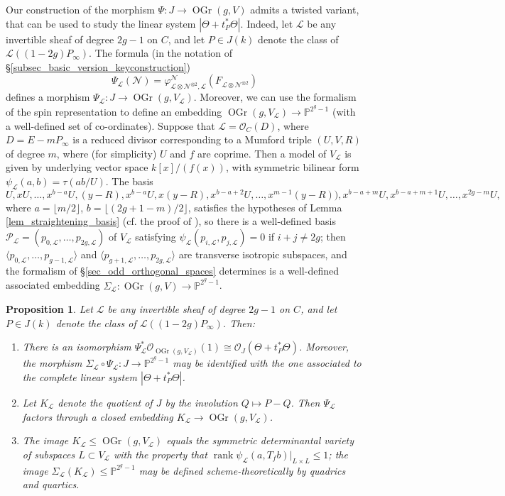 \documentclass{article} %
\newtheorem{proposition}{Proposition}[section]
\numberwithin{equation}{section}
\DeclareMathOperator{\rank}{rank}
\newcommand{\sh}[1]{\mathscr{#1}}
\renewcommand{\P}{\mathbb{P}}
\newcommand{\cO}{\mathcal{O}}
\DeclareMathOperator{\OGr}{OGr}
\begin{document}
Our construction of the morphism $\Psi : J \to \OGr(g, V)$ admits a twisted variant, that can be used to study the linear system $| \Theta + t_P^\ast \Theta|$. Indeed, let $\sh{L}$ be any invertible sheaf of degree $2g-1$ on $C$, and let $P \in J(k)$ denote the class of $\sh{L}((1-2g) P_\infty)$. The formula (in the notation of \S\ref{subsec_basic_version_keyconstruction})
\[ \Psi_{\sh{L}}(\sh{N}) = \varphi^{\sh{N}}_{\sh{L} \otimes \sh{N}^{\otimes 2}, \sh{L}}(F_{\sh{L} \otimes \sh{N}^{\otimes 2}}) \]
defines a morphism $\Psi_{\sh{L}} : J \to \OGr(g, V_{\sh{L}})$. Moreover, we can use the formalism of the spin representation to define an embedding $\OGr(g, V_{\sh{L}}) \to \P^{2^g-1}$ (with a well-defined set of co-ordinates). Suppose that $\sh{L} = \cO_C(D)$, where $D = E - m P_\infty$ is a reduced divisor corresponding to a Mumford triple $(U, V, R)$ of degree $m$, where (for simplicity)  $U$ and $f$ are coprime. Then a model of $V_{\sh{L}}$ is given by underlying vector space $k[x] / (f(x))$, with symmetric bilinear form $\psi_{\sh{L}}(a, b) = \tau(ab / U)$. The basis 
\[ U, x U, \dots, x^{b-a} U, (y-R), x^{b-a} U, x (y-R), x^{b-a+2} U, \dots, x^{m-1} (y-R)), x^{b-a+m} U, x^{b-a+m+1} U, \dots, x^{2g-m} U, \]
where $a = \lfloor m / 2 \rfloor$, $b = \lfloor (2g+1-m) /2 \rfloor$, satisfies the hypotheses of Lemma \ref{lem_straightening_basis} (cf. the proof of \cite[Lemma 4.9]{lagathorne2024smallheightoddhyperelliptic}), so there is a well-defined basis $\mathcal{P}_{\sh{L}} = (p_{0, \sh{L}}, \dots, p_{2g, \sh{L}})$ of $V_{\sh{L}}$ satisfying $\psi_{\sh{L}}(p_{i, \sh{L}}, p_{j, \sh{L}}) = 0$ if $i + j \neq 2g$; then  $\langle p_{0, \sh{L}}, \dots, p_{g-1, \sh{L}}\rangle$ and $\langle p_{g+1, \sh{L}}, \dots, p_{2g, \sh{L}} \rangle$ are transverse isotropic subspaces, and the formalism of \S \ref{sec_odd_orthogonal_spaces} determines is a well-defined associated embedding $\Sigma_{\sh{L}} : \OGr(g, V) \to \P^{2^g-1}$. 
\begin{proposition}
Let $\sh{L}$ be any invertible sheaf of degree $2g-1$ on $C$, and let $P \in J(k)$ denote the class of $\sh{L}((1-2g) P_\infty)$. Then:
\begin{enumerate}
    \item There is an isomorphism $\Psi_{\sh{L}}^\ast \cO_{\OGr(g, V_{\sh{L}})}(1) \cong \cO_J(\Theta + t_P^\ast \Theta)$. Moreover, the morphism $\Sigma_{\sh{L}} \circ \Psi_{\sh{L}} : J \to \P^{2^g-1}$ may be identified with the one associated to the complete linear system $|\Theta + t_P^\ast \Theta|$. 
    \item Let $K_{\sh{L}}$ denote the quotient of $J$ by the involution $Q \mapsto P - Q$. Then $\Psi_{\sh{L}}$ factors through a closed embedding $K_{\sh{L}} \to \OGr(g, V_{\sh{L}})$.
    \item The image $K_{\sh{L}} \leq \OGr(g, V_{\sh{L}})$ equals the symmetric determinantal variety of subspaces $L\subset V_{\sh{L}}$ with the property that $\rank \psi_{\sh{L}}(a, T_f b)|_{L \times L} \leq 1$; the image $\Sigma_{\sh{L}}(K_{\sh{L}}) \leq \P^{2^g-1}$ may be defined scheme-theoretically by quadrics and quartics. \end{enumerate}
\end{proposition}
\end{document}
